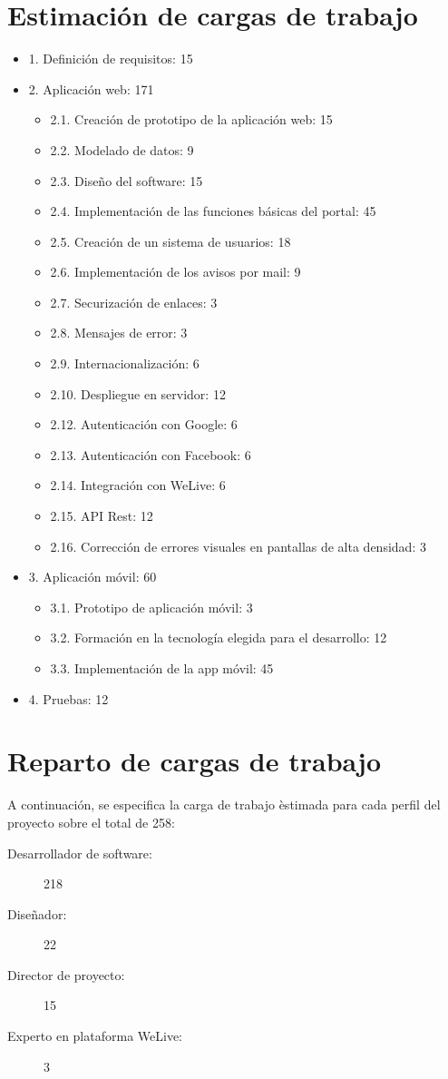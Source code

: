 \documentclass{DeustoFDP}
\begin{document}
\section{Estimación de cargas de trabajo}
\begin{itemize}
    \item 1. Definición de requisitos: 15
    \item 2. Aplicación web: 171
    \begin{itemize}
        \item 2.1. Creación de prototipo de la aplicación web: 15
        \item 2.2. Modelado de datos: 9
        \item 2.3. Diseño del software: 15
        \item 2.4. Implementación de las funciones básicas del portal: 45
        \item 2.5. Creación de un sistema de usuarios: 18
        \item 2.6. Implementación de los avisos por mail: 9
        \item 2.7. Securización de enlaces: 3
        \item 2.8. Mensajes de error: 3
        \item 2.9. Internacionalización: 6
        \item 2.10. Despliegue en servidor: 12
        \item 2.12. Autenticación con Google: 6
        \item 2.13. Autenticación con Facebook: 6
        \item 2.14. Integración con WeLive: 6
        \item 2.15. API Rest: 12
        \item 2.16. Corrección de errores visuales en pantallas de alta densidad: 3
    \end{itemize}
    \item 3. Aplicación móvil: 60
    \begin{itemize}
        \item 3.1. Prototipo de aplicación móvil: 3
        \item 3.2. Formación en la tecnología elegida para el desarrollo: 12
        \item 3.3. Implementación de la app móvil: 45
    \end{itemize}
    \item 4. Pruebas: 12
\end{itemize}
\section{Reparto de cargas de trabajo}
A continuación, se especifica la carga de trabajo èstimada para cada perfil del proyecto sobre el total de 258:
\begin{description}
    \item[Desarrollador de software:] 218
    \item[Diseñador:] 22
    \item[Director de proyecto:] 15
    \item[Experto en plataforma WeLive:] 3
\end{description}
\newpage
\end{document}
